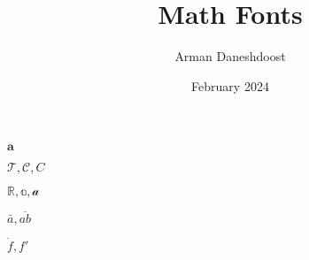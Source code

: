 \documentclass{article}
\title{Math Fonts}
\author{Arman Daneshdoost}
\date{February 2024}
\begin{document}
	\maketitle
	$\mathbf{a}$
	
	
	$\mathcal{T}, \mathcal{C}, C$
	
	$\mathbb{R}, \mathbb{a}, \mathcal{a}$
	
	$\bar{a}, \overline{ab}$
	
	$\dot f, f'$
\end{document}
